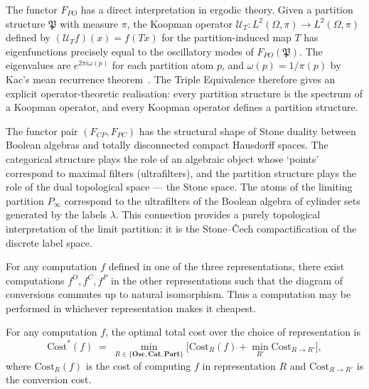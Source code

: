 \begin{remark}
\label{rem:koopman}
The functor $F_{PO}$ has a direct interpretation in ergodic theory.  Given
a partition structure $\mathfrak{P}$ with measure $\pi$, the Koopman
operator $\mathcal{U}_T : L^2(\Omega, \pi) \to L^2(\Omega, \pi)$ defined
by $(\mathcal{U}_T f)(x) = f(T x)$ for the partition-induced map $T$
has eigenfunctions precisely equal to the oscillatory modes of
$F_{PO}(\mathfrak{P})$.  The eigenvalues are $e^{2\pi i \omega(p)}$ for
each partition atom $p$, and $\omega(p) = 1/\pi(p)$ by Kac's mean
recurrence theorem~\citep{Halmos1950,Billingsley1995}.  The Triple
Equivalence therefore gives an explicit operator-theoretic realisation:
every partition structure is the spectrum of a Koopman operator, and every
Koopman operator defines a partition structure.
\end{remark}

\begin{remark}
\label{rem:stone}
The functor pair $(F_{CP}, F_{PC})$ has the structural shape of Stone
duality between Boolean algebras and totally disconnected compact Hausdorff
spaces.  The categorical structure plays the role of an algebraic object
whose `points' correspond to maximal filters (ultrafilters), and the
partition structure plays the role of the dual topological space — the
Stone space.  The atoms of the limiting partition $P_\infty$ correspond
to the ultrafilters of the Boolean algebra of cylinder sets generated by
the labels $\lambda$.  This connection provides a purely topological
interpretation of the limit partition: it is the Stone--\v{C}ech
compactification of the discrete label space.
\end{remark}

\begin{corollary}
\label{cor:free-conversion}
For any computation $f$ defined in one of the three representations, there
exist computations $f^O, f^C, f^P$ in the other representations such that
the diagram of conversions commutes up to natural isomorphism.  Thus a
computation may be performed in whichever representation makes it cheapest.
\end{corollary}

\begin{theorem}
\label{thm:opt-rep}
For any computation $f$, the optimal total cost over the choice of
representation is
\[
  \mathrm{Cost}^*(f)
  \;=\; \min_{R \in \{\mathbf{Osc}, \mathbf{Cat}, \mathbf{Part}\}}
  \bigl[\mathrm{Cost}_R(f) + \min_{R'} \mathrm{Cost}_{R \to R'}\bigr] ,
\]
where $\mathrm{Cost}_R(f)$ is the cost of computing $f$ in representation
$R$ and $\mathrm{Cost}_{R \to R'}$ is the conversion cost.
\end{theorem}

